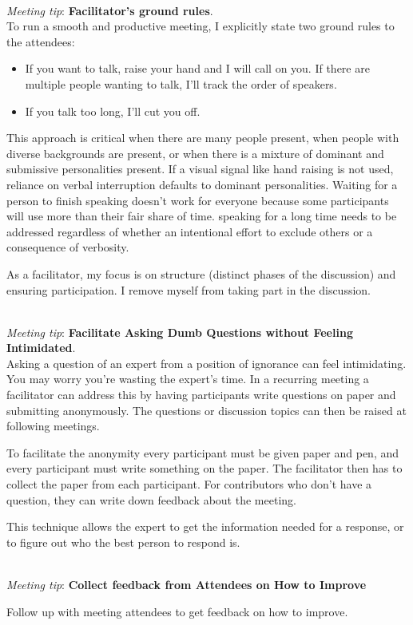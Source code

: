 \ \\
\textit{Meeting tip}: \textbf{Facilitator's ground rules}.\\
To run a smooth and productive meeting, I explicitly state two ground rules to the attendees:
\begin{itemize}
    \item If you want to talk, raise your hand and I will call on you. If there are multiple people wanting to talk, I'll track the order of speakers.
    \item If you talk too long, I'll cut you off. 
\end{itemize}
This approach is critical when there are many people present, when people with diverse backgrounds are present, or when there is a mixture of dominant and submissive personalities present. 
If a visual signal like hand raising is not used, reliance on verbal interruption defaults to dominant personalities. Waiting for a person to finish speaking doesn't work for everyone because some participants will use more than their fair share of time. speaking for a long time needs to be addressed regardless of whether an intentional effort to exclude others or a consequence of verbosity.

As a facilitator, my focus is on structure (distinct phases of the discussion) and ensuring participation. I remove myself from taking part in the discussion.

\ \\
\textit{Meeting tip}: \textbf{Facilitate Asking Dumb Questions without Feeling Intimidated}.\\

Asking a question of an expert from a position of ignorance can feel intimidating. You may worry you're wasting the expert's time. In a recurring meeting a facilitator can address this by having participants write questions on paper and submitting anonymously. The questions or discussion topics can then be raised at following meetings. 

To facilitate the anonymity every participant must be given paper and pen, and every participant must write something on the paper. The facilitator then has to collect the paper from each participant. For contributors who don't have a question, they can write down feedback about the meeting. 

This technique allows the expert to get the information needed for a response, or to figure out who the best person to respond is. 

\ \\
\textit{Meeting tip}: \textbf{Collect feedback from Attendees on How to Improve}

Follow up with meeting attendees to get feedback on how to improve.